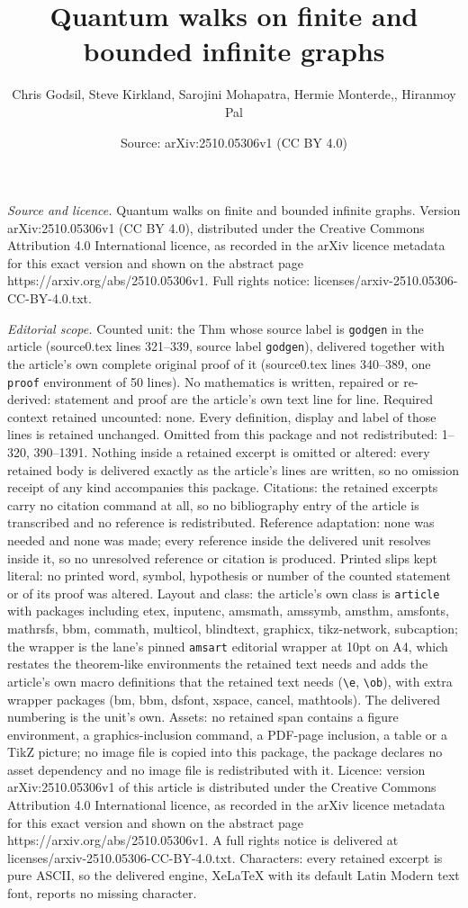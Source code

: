 \documentclass[10pt,a4paper]{amsart}
\title[Quantum walks on finite and bounded infinite graphs]{Quantum walks on finite and bounded infinite graphs}
\author{Chris Godsil, Steve Kirkland, Sarojini Mohapatra, Hermie Monterde,, Hiranmoy Pal}
\date{Source: arXiv:2510.05306v1 (CC BY 4.0)}
\begin{document}
\maketitle

\noindent\emph{Source and licence.} Quantum walks on finite and bounded infinite graphs. Version arXiv:2510.05306v1 (CC BY 4.0), distributed under the Creative Commons Attribution 4.0 International licence, as recorded in the arXiv licence metadata for this exact version and shown on the abstract page https://arxiv.org/abs/2510.05306v1. Full rights notice: licenses/arxiv-2510.05306-CC-BY-4.0.txt.\par\smallskip

\noindent\textit{Editorial scope.} Counted unit: the Thm whose source label is \texttt{godgen} in the article (source0.tex lines 321--339, source label \texttt{godgen}), delivered together with the article's own complete original proof of it (source0.tex lines 340--389, one \texttt{proof} environment of 50 lines). No mathematics is written, repaired or re-derived: statement and proof are the article's own text line for line. Required context retained uncounted: none. Every definition, display and label of those lines is retained unchanged. Omitted from this package and not redistributed: 1--320, 390--1391. Nothing inside a retained excerpt is omitted or altered: every retained body is delivered exactly as the article's lines are written, so no omission receipt of any kind accompanies this package. Citations: the retained excerpts carry no citation command at all, so no bibliography entry of the article is transcribed and no reference is redistributed. Reference adaptation: none was needed and none was made; every reference inside the delivered unit resolves inside it, so no unresolved reference or citation is produced. Printed slips kept literal: no printed word, symbol, hypothesis or number of the counted statement or of its proof was altered. Layout and class: the article's own class is \texttt{article} with packages including etex, inputenc, amsmath, amssymb, amsthm, amsfonts, mathrsfs, bbm, commath, multicol, blindtext, graphicx, tikz-network, subcaption; the wrapper is the lane's pinned \texttt{amsart} editorial wrapper at 10pt on A4, which restates the theorem-like environments the retained text needs and adds the article's own macro definitions that the retained text needs (\texttt{\textbackslash e}, \texttt{\textbackslash ob}), with extra wrapper packages (bm, bbm, dsfont, xspace, cancel, mathtools). The delivered numbering is the unit's own. Assets: no retained span contains a figure environment, a graphics-inclusion command, a PDF-page inclusion, a table or a TikZ picture; no image file is copied into this package, the package declares no asset dependency and no image file is redistributed with it. Licence: version arXiv:2510.05306v1 of this article is distributed under the Creative Commons Attribution 4.0 International licence, as recorded in the arXiv licence metadata for this exact version and shown on the abstract page https://arxiv.org/abs/2510.05306v1. A full rights notice is delivered at licenses/arxiv-2510.05306-CC-BY-4.0.txt. Characters: every retained excerpt is pure ASCII, so the delivered engine, XeLaTeX with its default Latin Modern text font, reports no missing character.
\end{document}
